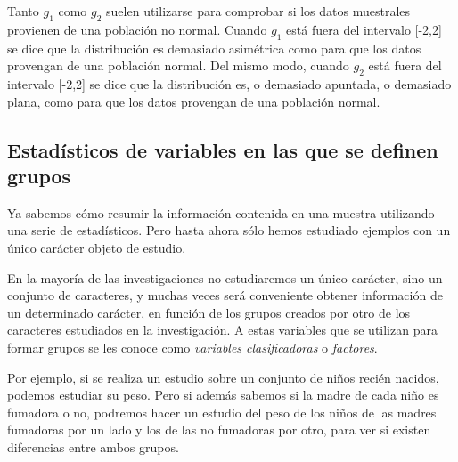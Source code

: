 Tanto $g_1$ como $g_2$ suelen utilizarse para comprobar si los datos muestrales provienen de una población no normal.
Cuando $g_1$  está fuera del intervalo [-2,2] se dice que la distribución es demasiado asimétrica como para que los
datos provengan de una población normal.
Del mismo modo, cuando $g_2$ está fuera del intervalo [-2,2] se dice que la distribución es, o demasiado apuntada, o
demasiado plana, como para que los datos provengan de una población normal.

\subsection{Estadísticos de variables en las que se definen grupos}
Ya sabemos cómo resumir la información contenida en una muestra utilizando una serie de estadísticos.
Pero hasta ahora sólo hemos estudiado ejemplos con un único carácter objeto de estudio.

En la mayoría de las investigaciones no estudiaremos un único carácter, sino un conjunto de caracteres, y muchas veces
será conveniente obtener información de un determinado carácter, en función de los grupos creados por otro de los
caracteres estudiados en la investigación.
A estas variables que se utilizan para formar grupos se les conoce como \emph{variables clasificadoras} o
\emph{factores}.

Por ejemplo, si se realiza un estudio sobre un conjunto de niños recién nacidos, podemos estudiar su peso.
Pero si además sabemos si la madre de cada niño es fumadora o no, podremos hacer un estudio del peso de los niños de las
madres fumadoras por un lado y los de las no fumadoras por otro, para ver si existen diferencias entre ambos grupos.

\clearpage
\newpage

